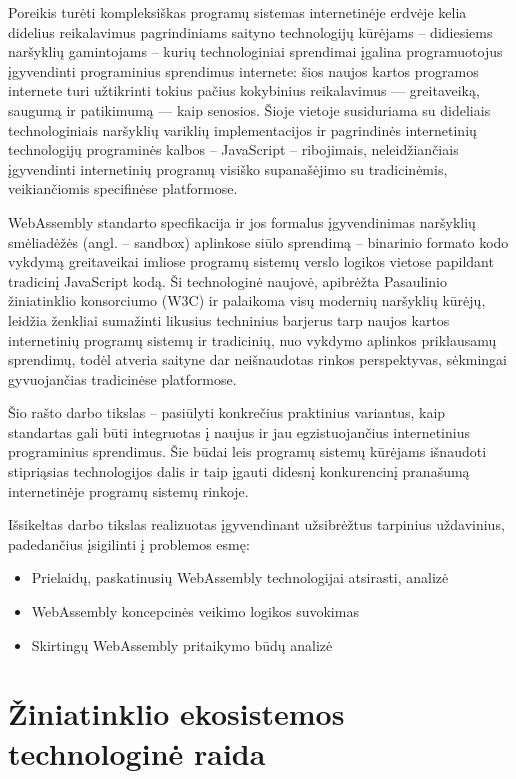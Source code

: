 \documentclass{VUMIFPSkursinis}
\begin{document}
Poreikis turėti kompleksiškas programų sistemas internetinėje erdvėje kelia didelius 
reikalavimus pagrindiniams saityno technologijų kūrėjams – didiesiems naršyklių gamintojams – 
kurių technologiniai sprendimai įgalina programuotojus įgyvendinti programinius sprendimus 
internete: šios naujos kartos programos internete turi užtikrinti tokius pačius kokybinius 
reikalavimus — greitaveiką, saugumą ir patikimumą — kaip senosios. Šioje vietoje susiduriama 
su dideliais technologiniais naršyklių variklių implementacijos ir pagrindinės internetinių 
technologijų programinės kalbos – JavaScript – ribojimais, neleidžiančiais įgyvendinti 
internetinių programų visiško supanašėjimo su tradicinėmis, veikiančiomis specifinėse 
platformose. 

WebAssembly standarto specfikacija ir jos formalus įgyvendinimas naršyklių 
smėliadėžės (angl. – sandbox) aplinkose siūlo sprendimą – binarinio formato kodo vykdymą 
greitaveikai imliose programų sistemų verslo logikos vietose papildant tradicinį JavaScript 
kodą. Ši technologinė naujovė, apibrėžta Pasaulinio žiniatinklio konsorciumo (W3C) ir palaikoma
visų modernių naršyklių kūrėjų, leidžia ženkliai sumažinti likusius techninius barjerus tarp 
naujos kartos internetinių programų sistemų ir tradicinių, nuo vykdymo aplinkos priklausamų 
sprendimų, todėl atveria saityne dar neišnaudotas rinkos perspektyvas, sėkmingai gyvuojančias
tradicinėse platformose. 

Šio rašto darbo tikslas – pasiūlyti konkrečius praktinius variantus, kaip standartas 
gali būti integruotas į naujus ir jau egzistuojančius internetinius programinius sprendimus. 
Šie būdai leis programų sistemų kūrėjams išnaudoti stipriąsias technologijos dalis ir taip 
įgauti didesnį konkurencinį pranašumą internetinėje programų sistemų rinkoje.

Išsikeltas darbo tikslas realizuotas įgyvendinant užsibrėžtus tarpinius uždavinius, padedančius įsigilinti į problemos esmę:
\begin{itemize}
    \item Prielaidų, paskatinusių WebAssembly technologijai atsirasti, analizė
    \item WebAssembly koncepcinės veikimo logikos suvokimas
    \item Skirtingų WebAssembly pritaikymo būdų analizė
\end{itemize}

\section{Žiniatinklio ekosistemos technologinė raida}
\end{document}
